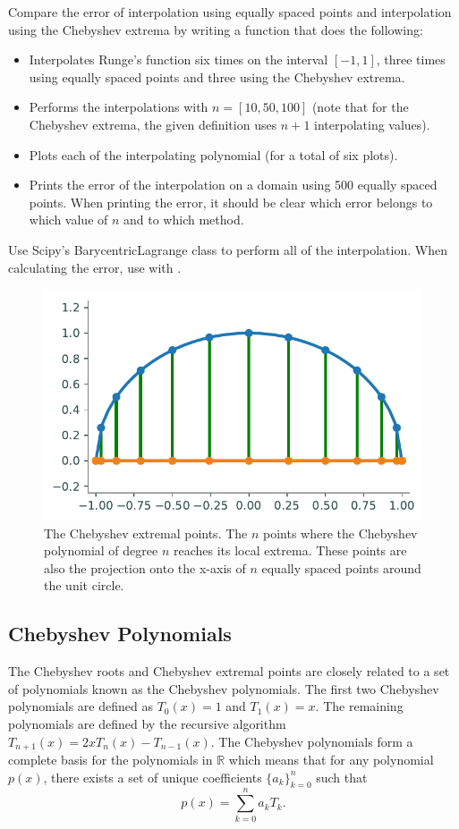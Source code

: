 \begin{problem}
Compare the error of interpolation using equally spaced points and interpolation using the Chebyshev extrema by writing a function that does the following:
\begin{itemize}
\item Interpolates Runge's function six times on the interval $[-1,1]$, three times using equally spaced points and three using the Chebyshev extrema.
\item Performs the interpolations with $n=[10,50,100]$ (note that for the Chebyshev extrema, the given definition uses $n+1$ interpolating values).
\item Plots each of the interpolating polynomial (for a total of six plots).
\item Prints the error of the interpolation on a domain using 500 equally spaced points.  When printing the error, it should be clear which error belongs to which value of $n$ and to which method.
\end{itemize}
Use Scipy's BarycentricLagrange class to perform all of the interpolation.
When calculating the error, use  with .
\end{problem}

\begin{figure}
\centering
\includegraphics{figures/extrema.pdf}
\caption{The Chebyshev extremal points.  The $n$ points where the Chebyshev polynomial of degree $n$ reaches its local extrema.
These points are also the projection onto the x-axis of $n$ equally spaced points around the unit circle.}
\label{fig:extrema}
\end{figure}

\subsection*{Chebyshev Polynomials}
The Chebyshev roots and Chebyshev extremal points are closely related to a set of polynomials known as the Chebyshev polynomials.
The first two Chebyshev polynomials are defined as $T_0(x)=1$ and $T_1(x)=x$.
The remaining polynomials are defined by the recursive algorithm $T_{n+1}(x)=2xT_n(x)-T_{n-1}(x)$.
The Chebyshev polynomials form a complete basis for the polynomials in $\mathbb{R}$ which means that for any polynomial $p(x)$,  there exists a set of unique coefficients $\{a_k\}_{k=0}^n$
such that
\[
p(x) = \sum_{k=0}^n a_kT_k.
\]

